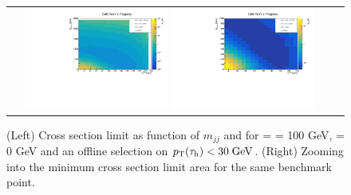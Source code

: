 \begin{figure}[tbh!]
	\centering
	\begin{tabular}{cc}
		\includegraphics[width=0.45\textwidth]{analysis/pics/JetInvMass_vs_MET_xsec_chi100_lsp000_taupt30.pdf}
		\includegraphics[width=0.45\textwidth]{analysis/pics/JetInvMass_vs_MET_xsec_chi100_lsp000_taupt30_zoom.pdf}
	\end{tabular}
	\caption{(Left) Cross section limit as function of $m_{jj}$ and \met for \charginopm = \neutralinotwo = 100 GeV, \neutralinoone = 0 GeV and an offline selection on $p_{\text{T}}(\tau_{\text{h}}) <  30\;\text{Ge}\kern-0.06667em\text{V}$. (Right) Zooming into the minimum cross section limit area for the same benchmark point.}
	\label{fig::JetInvMass_vs_MET_xsec_chi100_lsp000_taupt30}
\end{figure}

